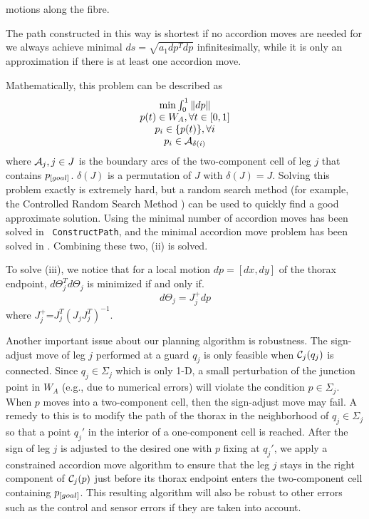 motions along the fibre.
\begin{Remark}
\rm The path constructed in this way is shortest if no accordion
moves are needed for we always achieve minimal
$ds=\sqrt{a_1dp^Tdp}$ infinitesimally, while it is only an
approximation if there is at least one accordion move.
\end{Remark}
Mathematically, this problem can be described as
%
\[
    \begin{array}{c}
     \min  \int_0^1 \|dp\|   \\
      p(t) \in W_A, \forall t \in [0,1] \\
      p_i \in \{p(t)\}, \forall i \\
      p_i \in {\cal A}_{\delta(i)}
    \end{array}
\]
%
where ${\cal A}_j, j\in J$ is the boundary arcs of the
two-component cell of leg $j$ that contains $p_{\textit{\rm{[}}goal]}$.
$\delta(J)$ is a permutation of $J$ with $\delta(J) =J$. Solving
this problem exactly is extremely hard, but a random search method
(for example, the Controlled Random Search Method \cite{BS96}) can
be used to quickly find a good approximate solution. Using the
minimal number of accordion moves has been solved in {\tt
ConstructPath}, and the minimal accordion move problem has been
solved in \cite{MT1}. Combining these two, (ii) is solved.

To solve (iii), we notice that for a local motion $dp=[dx,dy]$ of
the thorax endpoint, $d\Theta_j^Td\Theta_j$ is minimized if and
only if.
%
\[
   d\Theta_j=J_j^+ dp
\]
%
where $J_j^+$=$J_j^T(J_jJ_j^T)^{-1}$.

Another important issue about our planning algorithm is
robustness. The sign-adjust move of leg $j$ performed at a guard
$q_j$ is only feasible when ${\cal C}_j(q_j)$ is connected. Since
$q_j \in \Sigma_j$ which is only 1-D, a small perturbation of the
junction point in $W_A$ (e.g., due to numerical errors) will
violate the condition $p \in \Sigma_j$. When $p$ moves into a
two-component cell, then the sign-adjust move may fail. A remedy
to this is to modify the path of the thorax in the neighborhood of
$q_j \in \Sigma_j$ so that a point $q_j'$ in the interior of a
one-component cell is reached. After the sign of leg $j$ is
adjusted to the desired one with $p$ fixing at $q_j'$, we apply a
constrained accordion move algorithm to ensure that the leg $j$
stays in the right component of ${\cal C}_j(p)$ just before its
thorax endpoint enters the two-component cell containing
$p_{\textit{\rm{[}}goal]}$.  This resulting algorithm will also be robust
to other errors such as the control and sensor errors if they are
taken into account.


